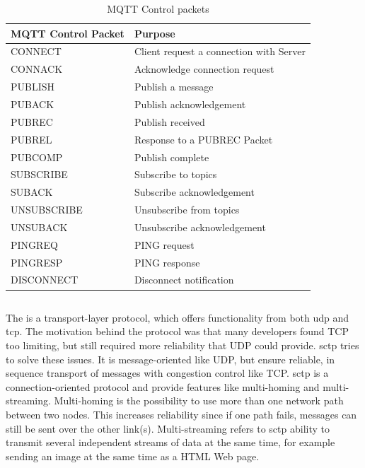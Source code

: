 \begin{table}[h]
\begin{tabularx}{\textwidth}{| X | X |}
\hline
  \textbf{MQTT Control Packet} & \textbf{Purpose} \\ \hline
  CONNECT & Client request a connection with Server \\ \hline
  CONNACK & Acknowledge connection request \\ \hline
  PUBLISH & Publish a message \\ \hline
  PUBACK & Publish acknowledgement \\ \hline
  PUBREC &  Publish received \\ \hline
  PUBREL & Response to a PUBREC Packet \\ \hline
  PUBCOMP & Publish complete \\ \hline
  SUBSCRIBE & Subscribe to topics \\ \hline
  SUBACK & Subscribe acknowledgement\\ \hline
  UNSUBSCRIBE & Unsubscribe from topics\\ \hline
  UNSUBACK & Unsubscribe acknowledgement \\ \hline
  PINGREQ & PING request \\ \hline
  PINGRESP & PING response \\ \hline
  DISCONNECT & Disconnect notification \\ \hline
\end{tabularx}
\caption{MQTT Control packets}
\label{table:mqtt-packets}
\end{table}


\subsection{}

The  is a transport-layer protocol, which offers
functionality from both \gls{udp} and \gls{tcp}\cite{rfc-sctp}. The motivation
behind the protocol was that many developers found TCP too limiting, but still
required more reliability that UDP could provide. \gls{sctp} tries to solve
these issues. It is message-oriented like UDP, but ensure reliable, in sequence
transport of messages with congestion control like TCP. \gls{sctp} is a
connection-oriented protocol and provide features like multi-homing and
multi-streaming. Multi-homing is the possibility to use more than one network
path between two nodes. This increases reliability since if one path fails,
messages can still be sent over the other link(s). Multi-streaming refers to
\gls{sctp} ability to transmit several independent streams of data at the same
time, for example sending an image at the same time as a HTML Web page.

